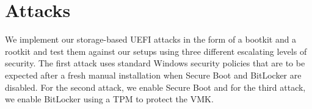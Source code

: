 
\chapter{Attacks}
\label{sec:attacks}

We implement our storage-based \ac{UEFI} attacks in the form of a bootkit and a rootkit and test them against our setups using three different escalating levels of security.
The first attack uses standard Windows security policies that are to be expected after a fresh manual installation when  Secure Boot and BitLocker are disabled.
For the second attack, we enable Secure Boot and for the third attack, we enable BitLocker using a \ac{TPM} to protect the \ac{VMK}.




